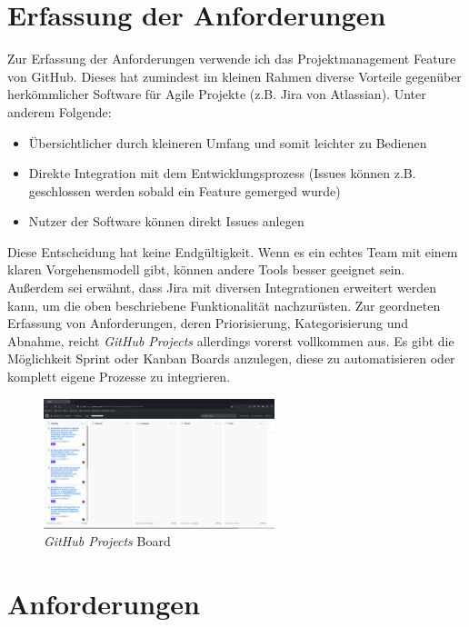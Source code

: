 \documentclass{article}
\begin{document}

\section{Erfassung der Anforderungen}

Zur Erfassung der Anforderungen verwende ich das Projektmanagement Feature von GitHub. Dieses hat zumindest im
kleinen Rahmen diverse Vorteile gegenüber herkömmlicher Software für Agile Projekte (z.B. Jira von Atlassian).
Unter anderem Folgende:

\begin{itemize}
	\item Übersichtlicher durch kleineren Umfang und somit leichter zu Bedienen
	\item Direkte Integration mit dem Entwicklungsprozess (Issues können z.B.
	      geschlossen werden sobald ein Feature gemerged wurde)
	\item Nutzer der Software können direkt Issues anlegen
\end{itemize}

Diese Entscheidung hat keine Endgültigkeit. Wenn es ein echtes Team mit einem klaren Vorgehensmodell gibt, können
andere Tools besser geeignet sein. Außerdem sei erwähnt, dass Jira mit diversen Integrationen erweitert werden
kann, um die oben beschriebene Funktionalität nachzurüsten. Zur geordneten Erfassung von Anforderungen, deren
Priorisierung, Kategorisierung und Abnahme, reicht \emph{GitHub Projects} allerdings vorerst vollkommen aus. Es gibt die
Möglichkeit Sprint oder Kanban Boards anzulegen, diese zu automatisieren oder komplett eigene Prozesse zu
integrieren.

\vspace{1em}

\begin{figure}[h]
	\includegraphics[width=0.6\textwidth]{github-projects}
	\centering
	\caption{\emph{GitHub Projects} Board}
\end{figure}

\newpage

\section{Anforderungen}
\end{document}
